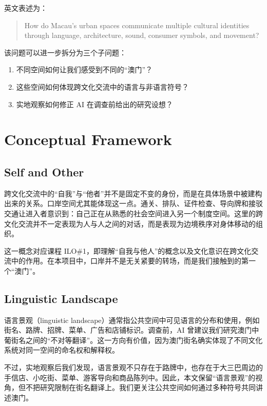 \documentclass[12pt,a4paper]{article}
\begin{document}
英文表述为：

\begin{quote}
How do Macau's urban spaces communicate multiple cultural identities through language, architecture, sound, consumer symbols, and movement?
\end{quote}

该问题可以进一步拆分为三个子问题：

\begin{enumerate}
  \item 不同空间如何让我们感受到不同的“澳门”？
  \item 这些空间如何体现跨文化交流中的语言与非语言符号？
  \item 实地观察如何修正 AI 在调查前给出的研究设想？
\end{enumerate}

\section{Conceptual Framework}

\subsection{Self and Other}

跨文化交流中的“自我”与“他者”并不是固定不变的身份，而是在具体场景中被建构出来的关系。口岸空间尤其能体现这一点。通关、排队、证件检查、导向牌和接驳交通让进入者意识到：自己正在从熟悉的社会空间进入另一个制度空间。这里的跨文化交流并不一定表现为人与人之间的对话，而是表现为边境秩序对身体移动的组织。

这一概念对应课程 ILO\#1，即理解“自我与他人”的概念以及文化意识在跨文化交流中的作用。在本项目中，口岸并不是无关紧要的转场，而是我们接触到的第一个“澳门”。

\subsection{Linguistic Landscape}

语言景观（linguistic landscape）通常指公共空间中可见语言的分布和使用，例如街名、路牌、招牌、菜单、广告和店铺标识。调查前，AI 曾建议我们研究澳门中葡街名之间的“不对等翻译”。这一方向有价值，因为澳门街名确实体现了不同文化系统对同一空间的命名权和解释权。

不过，实地观察后我们发现，语言景观不只存在于路牌中，也存在于大三巴周边的手信店、小吃街、菜单、游客导向和商品陈列中。因此，本文保留“语言景观”的视角，但不把研究限制在街名翻译上。我们更关注公共空间如何通过多种符号共同讲述澳门。
\end{document}
